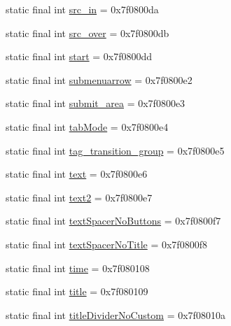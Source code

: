 \begin{DoxyCompactItemize}
\item 
static final int \mbox{\hyperlink{classcom_1_1synnapps_1_1carouselview_1_1_r_1_1id_a8a27c757b98c042e5ab153d31488e399}{src\+\_\+in}} = 0x7f0800da
\item 
static final int \mbox{\hyperlink{classcom_1_1synnapps_1_1carouselview_1_1_r_1_1id_a407f198b44bb2f98d984772f1e7da352}{src\+\_\+over}} = 0x7f0800db
\item 
static final int \mbox{\hyperlink{classcom_1_1synnapps_1_1carouselview_1_1_r_1_1id_af245f459b7f067016172edd3f9b5e5b0}{start}} = 0x7f0800dd
\item 
static final int \mbox{\hyperlink{classcom_1_1synnapps_1_1carouselview_1_1_r_1_1id_a8f7885d64e80e8ca3851687069b4fdda}{submenuarrow}} = 0x7f0800e2
\item 
static final int \mbox{\hyperlink{classcom_1_1synnapps_1_1carouselview_1_1_r_1_1id_a25767b53ee8560b4c6df1d40d65ebdab}{submit\+\_\+area}} = 0x7f0800e3
\item 
static final int \mbox{\hyperlink{classcom_1_1synnapps_1_1carouselview_1_1_r_1_1id_a003bfc19c0e395292dcd8b013772c551}{tab\+Mode}} = 0x7f0800e4
\item 
static final int \mbox{\hyperlink{classcom_1_1synnapps_1_1carouselview_1_1_r_1_1id_ad949fe1676b80650ed277851b2ca3a84}{tag\+\_\+transition\+\_\+group}} = 0x7f0800e5
\item 
static final int \mbox{\hyperlink{classcom_1_1synnapps_1_1carouselview_1_1_r_1_1id_abd459983503ffe34287b6d56ab25246c}{text}} = 0x7f0800e6
\item 
static final int \mbox{\hyperlink{classcom_1_1synnapps_1_1carouselview_1_1_r_1_1id_a00d06bb5c6ab65984e495336768c347a}{text2}} = 0x7f0800e7
\item 
static final int \mbox{\hyperlink{classcom_1_1synnapps_1_1carouselview_1_1_r_1_1id_a7f8c2ba2f477ddaff9c425132108869b}{text\+Spacer\+No\+Buttons}} = 0x7f0800f7
\item 
static final int \mbox{\hyperlink{classcom_1_1synnapps_1_1carouselview_1_1_r_1_1id_a27d1faa9c263a578c4a12a9b02b201a7}{text\+Spacer\+No\+Title}} = 0x7f0800f8
\item 
static final int \mbox{\hyperlink{classcom_1_1synnapps_1_1carouselview_1_1_r_1_1id_a2ee1ea6440d40963c3dd2dc1fa6b51a1}{time}} = 0x7f080108
\item 
static final int \mbox{\hyperlink{classcom_1_1synnapps_1_1carouselview_1_1_r_1_1id_ae48c6fd6d4883f9301fe9cd703586172}{title}} = 0x7f080109
\item 
static final int \mbox{\hyperlink{classcom_1_1synnapps_1_1carouselview_1_1_r_1_1id_a1607a64a82ada52e79755b19d3ebf166}{title\+Divider\+No\+Custom}} = 0x7f08010a

\end{DoxyCompactItemize}
